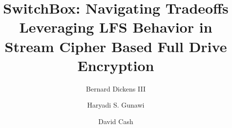\documentclass[sigplan,10pt,review,anonymous]{acmart}\settopmatter{printfolios=true,printccs=false,printacmref=false}
\begin{document}
\title[SwitchBox: Navigating Tradeoffs in Stream Cipher Based FDE]{SwitchBox:
Navigating Tradeoffs Leveraging LFS Behavior in Stream Cipher Based Full Drive
Encryption}



\author{Bernard Dickens III}

\author{Haryadi S. Gunawi}

\author{David Cash}
\end{document}
